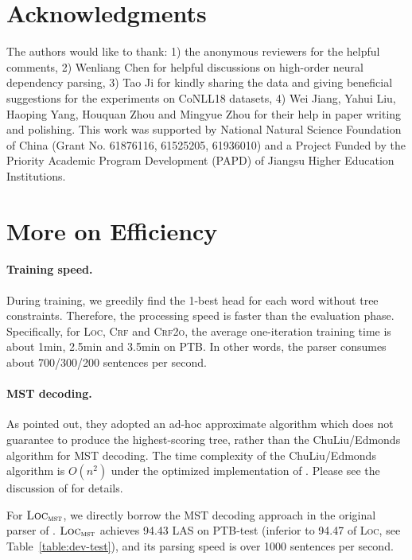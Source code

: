 \documentclass[11pt,a4paper]{article}
\begin{document}
 
\section*{Acknowledgments}

The authors would like to thank: 1) the anonymous reviewers for the helpful comments, 2) Wenliang Chen for helpful discussions on high-order neural dependency parsing, 3) Tao Ji for kindly sharing the data and giving beneficial suggestions for the experiments on CoNLL18 datasets, 4)
Wei Jiang, Yahui Liu, Haoping Yang, Houquan Zhou and Mingyue Zhou for their help in paper writing and polishing.
This work was supported by National Natural Science Foundation of China (Grant No. 61876116, 61525205, 61936010) and a Project Funded by the Priority Academic Program Development (PAPD) of Jiangsu Higher Education Institutions.




\appendix
\section{More on Efficiency}
\label{section:decoding-efficiency}
\paragraph{Training speed.}
During training, we greedily find the 1-best head for each word without tree constraints.
Therefore, the processing speed is faster than the evaluation phase. Specifically, for \textsc{Loc}, \textsc{Crf} and \textsc{Crf2o}, the average one-iteration training time is about 1min, 2.5min and 3.5min on PTB.
In other words, the parser consumes about 700/300/200 sentences per second.

\paragraph{MST decoding.}
As \citet{dozat-etal-2017-stanfords} pointed out, they adopted an ad-hoc approximate algorithm which does not guarantee to produce the highest-scoring tree, rather than the ChuLiu/Edmonds algorithm for MST decoding.
The time complexity of the ChuLiu/Edmonds algorithm is $O(n^2)$ under the optimized implementation of \citet{tarjan1977finding}.
Please see the discussion of \citet{mcdonald-etal-2005-non} for details.


For $\textsc{Loc}_{\textsc{mst}}$, we directly borrow the MST decoding approach in the original parser of \citet{Timothy-d17-biaffine}. $\textsc{Loc}_{\textsc{mst}}$ achieves 94.43 LAS on PTB-test (inferior to 94.47 of \textsc{Loc}, see Table~\ref{table:dev-test}), and its parsing speed is over 1000 sentences per second.
\end{document}
